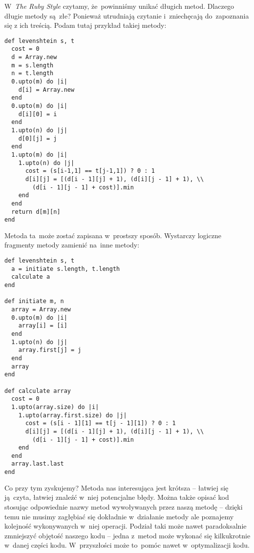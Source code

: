 W~\textit{The Ruby Style} czytamy, że~powinniśmy unikać długich metod. Dlaczego długie metody są~złe? Ponieważ utrudniają czytanie i~zniechęcają do~zapoznania się z ich treścią. Podam tutaj przykład takiej metody:

  \begin{lstlisting}
def levenshtein s, t
  cost = 0
  d = Array.new
  m = s.length
  n = t.length
  0.upto(m) do |i|
    d[i] = Array.new
  end
  0.upto(m) do |i|
    d[i][0] = i
  end
  1.upto(n) do |j|
    d[0][j] = j
  end
  1.upto(m) do |i|
    1.upto(n) do |j|
      cost = (s[i-1,1] == t[j-1,1]) ? 0 : 1
      d[i][j] = [(d[i - 1][j] + 1), (d[i][j - 1] + 1), \\
        (d[i - 1][j - 1] + cost)].min
    end
  end
  return d[m][n]
end
  \end{lstlisting}

Metoda ta~może zostać zapisana w~prostszy sposób. Wystarczy logiczne fragmenty metody zamienić na~inne metody:

  \begin{lstlisting}
def levenshtein s, t
  a = initiate s.length, t.length
  calculate a
end

def initiate m, n
  array = Array.new
  0.upto(m) do |i|
    array[i] = [i]
  end
  1.upto(n) do |j|
    array.first[j] = j
  end
  array
end

def calculate array
  cost = 0
  1.upto(array.size) do |i|
    1.upto(array.first.size) do |j|
      cost = (s[i - 1][1] == t[j - 1][1]) ? 0 : 1
      d[i][j] = [(d[i - 1][j] + 1), (d[i][j - 1] + 1), \\
        (d[i - 1][j - 1] + cost)].min
    end
  end
  array.last.last
end
  \end{lstlisting}

Co przy tym zyskujemy? Metoda nas interesująca jest krótsza -- łatwiej się ją~czyta, łatwiej znaleźć w~niej potencjalne błędy. Można także opisać kod stosując odpowiednie nazwy metod wywoływanych przez naszą metodę -- dzięki temu nie musimy zagłębiać się dokładnie w~działanie metody ale poznajemy kolejność wykonywanych w~niej operacji. Podział taki może nawet paradoksalnie zmniejszyć objętość naszego kodu -- jedna z~metod może wykonać się kilkukrotnie w~danej części kodu. W~przyszłości może to~pomóc nawet w~optymalizacji kodu.


